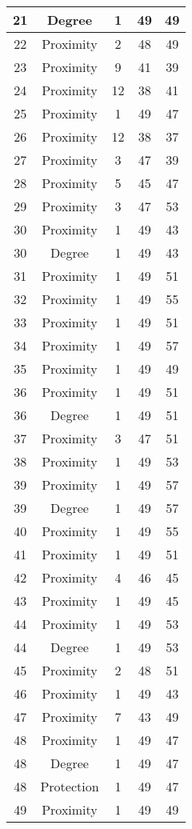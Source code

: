 \documentclass[results.tex]{subfiles}
\begin{document}
\begin{center}
\begin{tabular}{| c || c | c | c | c |}
    \hline
    21 & Degree & 1 & 49 & 49 \\ 
    \hline
    22 & Proximity & 2 & 48 & 49 \\ 
    \hline
    23 & Proximity & 9 & 41 & 39 \\ 
    \hline
    24 & Proximity & 12 & 38 & 41 \\ 
    \hline
    25 & Proximity & 1 & 49 & 47 \\ 
    \hline
    26 & Proximity & 12 & 38 & 37 \\ 
    \hline
    27 & Proximity & 3 & 47 & 39 \\ 
    \hline
    28 & Proximity & 5 & 45 & 47 \\ 
    \hline
    29 & Proximity & 3 & 47 & 53 \\ 
    \hline
    30 & Proximity & 1 & 49 & 43 \\ 
    \hline
    30 & Degree & 1 & 49 & 43 \\ 
    \hline
    31 & Proximity & 1 & 49 & 51 \\ 
    \hline
    32 & Proximity & 1 & 49 & 55 \\ 
    \hline
    33 & Proximity & 1 & 49 & 51 \\ 
    \hline
    34 & Proximity & 1 & 49 & 57 \\ 
    \hline
    35 & Proximity & 1 & 49 & 49 \\ 
    \hline
    36 & Proximity & 1 & 49 & 51 \\ 
    \hline
    36 & Degree & 1 & 49 & 51 \\ 
    \hline
    37 & Proximity & 3 & 47 & 51 \\ 
    \hline
    38 & Proximity & 1 & 49 & 53 \\ 
    \hline
    39 & Proximity & 1 & 49 & 57 \\ 
    \hline
    39 & Degree & 1 & 49 & 57 \\ 
    \hline
    40 & Proximity & 1 & 49 & 55 \\ 
    \hline
    41 & Proximity & 1 & 49 & 51 \\ 
    \hline
    42 & Proximity & 4 & 46 & 45 \\ 
    \hline
    43 & Proximity & 1 & 49 & 45 \\ 
    \hline
    44 & Proximity & 1 & 49 & 53 \\ 
    \hline
    44 & Degree & 1 & 49 & 53 \\ 
    \hline
    45 & Proximity & 2 & 48 & 51 \\ 
    \hline
    46 & Proximity & 1 & 49 & 43 \\ 
    \hline
    47 & Proximity & 7 & 43 & 49 \\ 
    \hline
    48 & Proximity & 1 & 49 & 47 \\ 
    \hline
    48 & Degree & 1 & 49 & 47 \\ 
    \hline
    48 & Protection & 1 & 49 & 47 \\ 
    \hline
    49 & Proximity & 1 & 49 & 49 \\ 
    \hline   \end{tabular}
\end{center}
\end{document}
